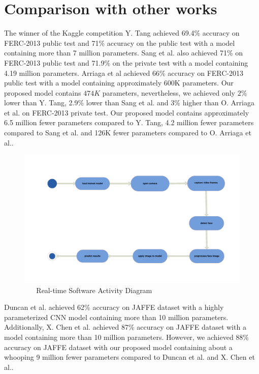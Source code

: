 \documentclass[master]{thesis-uestc}
\begin{document}
\section{Comparison with other works}
The winner of the Kaggle competition Y. Tang\cite{tang2018} achieved 69.4\% accuracy on FERC-2013 public test and 71\% accuracy on the public test with a model containing more than 7 million parameters. Sang et al.\cite{sang-2017} also achieved 71\% on FERC-2013 public test and 71.9\% on the private test with a model containing 4.19 million parameters. Arriaga et al\cite{DBLP:journals/corr/abs-1710-07557} achieved 66\% accuracy on FERC-2013 public test with a model containing approximately 600K parameters. Our proposed model contains $474K$ parameters, nevertheless, we achieved only $2\%$ lower than Y. Tang\cite{tang2018}, 2.9\% lower than Sang et al.\cite{sang-2017} and 3\% higher than O. Arriaga et al.\cite{DBLP:journals/corr/abs-1710-07557} on FERC-2013 private test. Our proposed model contains approximately 6.5 million fewer parameters compared to Y. Tang\cite{tang2018}, 4.2 million fewer parameters compared to Sang et al.\cite{sang-2017} and 126K fewer parameters compared to O. Arriaga et al.\cite{DBLP:journals/corr/abs-1710-07557}.

\begin{figure}[ht]
\includegraphics[width=6in]{pic/activity_diagram.pdf}
\caption{\,\,\,\,\,\,\,\,\,\,Real-time Software Activity Diagram}
\label{system_description}
\end{figure}

Duncan et al.\cite{duncan2016} achieved 62\% accuracy on JAFFE dataset with a highly parameterized CNN model containing more than 10 million parameters. Additionally, X. Chen et al.\cite{7988558} achieved 87\% accuracy on JAFFE dataset with a model containing more than 10 million parameters. However, we achieved $88\%$ accuracy on JAFFE dataset with our proposed model containing about a whooping 9 million fewer parameters compared to Duncan et al.\cite{duncan2016} and X. Chen et al.\cite{7988558}.
\end{document}
